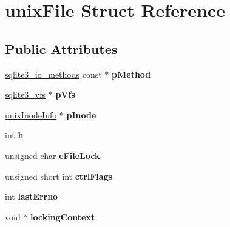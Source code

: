 \hypertarget{structunix_file}{\section{unix\-File Struct Reference}
\label{structunix_file}
}
\subsection*{Public Attributes}
\begin{DoxyCompactItemize}
\item 
\hypertarget{structunix_file_a2a2b40e965f91aa9ee21135bfb0c17ec}{\hyperlink{structsqlite3__io__methods}{sqlite3\-\_\-io\-\_\-methods} const $\ast$ {\bfseries p\-Method}}\label{structunix_file_a2a2b40e965f91aa9ee21135bfb0c17ec}

\item 
\hypertarget{structunix_file_a048d696479bb2544ab2cec1ac9a75d67}{\hyperlink{structsqlite3__vfs}{sqlite3\-\_\-vfs} $\ast$ {\bfseries p\-Vfs}}\label{structunix_file_a048d696479bb2544ab2cec1ac9a75d67}

\item 
\hypertarget{structunix_file_ac17292fe29bb6cc9eceed9db6d1209e8}{\hyperlink{structunix_inode_info}{unix\-Inode\-Info} $\ast$ {\bfseries p\-Inode}}\label{structunix_file_ac17292fe29bb6cc9eceed9db6d1209e8}

\item 
\hypertarget{structunix_file_a1c58798d4ff3ac6232765c8b76bb7450}{int {\bfseries h}}\label{structunix_file_a1c58798d4ff3ac6232765c8b76bb7450}

\item 
\hypertarget{structunix_file_a001e59bdb9d3f396952c2c8e3229f7fc}{unsigned char {\bfseries e\-File\-Lock}}\label{structunix_file_a001e59bdb9d3f396952c2c8e3229f7fc}

\item 
\hypertarget{structunix_file_a05d9d0af8aa4d9de6a250984cc12ae56}{unsigned short int {\bfseries ctrl\-Flags}}\label{structunix_file_a05d9d0af8aa4d9de6a250984cc12ae56}

\item 
\hypertarget{structunix_file_afde57c2e118fac8041918dac2ee6f7d1}{int {\bfseries last\-Errno}}\label{structunix_file_afde57c2e118fac8041918dac2ee6f7d1}

\item 
\hypertarget{structunix_file_afaeb4425a6de3e913db4b03e8a0d098a}{void $\ast$ {\bfseries locking\-Context}}\label{structunix_file_afaeb4425a6de3e913db4b03e8a0d098a}


\end{DoxyCompactItemize}
